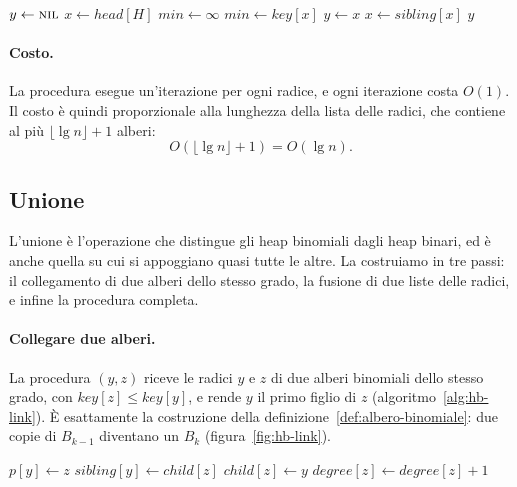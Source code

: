 \begin{algorithm}[htbp]
\caption{La ricerca del nodo con la chiave minima, che si trova in una delle radici.}\label{alg:hb-minimum}
\begin{algorithmic}[1]
  \State $y \gets \textsc{nil}$
  \State $x \gets \mathit{head}[H]$
  \State $\mathit{min} \gets \infty$
      \State $\mathit{min} \gets \mathit{key}[x]$
      \State $y \gets x$
    \EndIf
    \State $x \gets \mathit{sibling}[x]$
  \EndWhile
  \State \Return $y$
\EndProcedure
\end{algorithmic}
\end{algorithm}

\paragraph{Costo.}
La procedura esegue un'iterazione per ogni radice, e ogni iterazione costa $O(1)$. Il costo è quindi proporzionale alla lunghezza della lista delle radici, che contiene al più $\lfloor \lg n \rfloor + 1$ alberi:
\[
O(\lfloor \lg n \rfloor + 1) = O(\lg n).
\]

\subsection{Unione}\label{sec:hb-union}
L'unione è l'operazione che distingue gli heap binomiali dagli heap binari, ed è anche quella su cui si appoggiano quasi tutte le altre. La costruiamo in tre passi: il collegamento di due alberi dello stesso grado, la fusione di due liste delle radici, e infine la procedura completa.

\paragraph{Collegare due alberi.}
La procedura \BinomialLink$(y,z)$ riceve le radici $y$ e $z$ di due alberi binomiali dello stesso grado, con $\mathit{key}[z] \le \mathit{key}[y]$, e rende $y$ il primo figlio di $z$ (algoritmo~\ref{alg:hb-link}). È esattamente la costruzione della definizione~\ref{def:albero-binomiale}: due copie di $B_{k-1}$ diventano un $B_k$ (figura~\ref{fig:hb-link}).

\begin{algorithm}[htbp]
\caption{Il collegamento di due alberi binomiali dello stesso grado, con $\mathit{key}[z] \le \mathit{key}[y]$: $y$ diventa il primo figlio di $z$.}\label{alg:hb-link}
\begin{algorithmic}[1]
  \State $p[y] \gets z$
  \State $\mathit{sibling}[y] \gets \mathit{child}[z]$
  \State $\mathit{child}[z] \gets y$
  \State $\mathit{degree}[z] \gets \mathit{degree}[z] + 1$
\EndProcedure
\end{algorithmic}
\end{algorithm}

